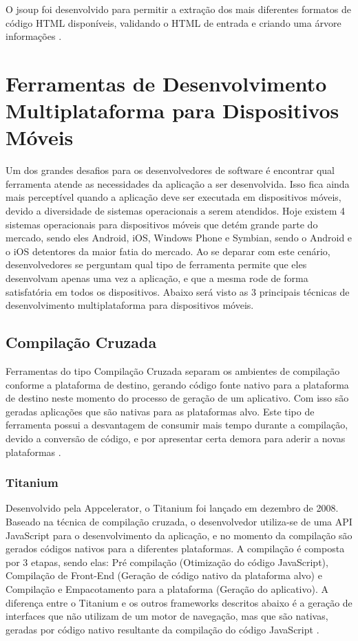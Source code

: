 O jsoup foi desenvolvido para permitir a extração dos mais diferentes formatos de código HTML disponíveis, validando o HTML de entrada e criando uma árvore informações \cite{JSOUP}.

\section{Ferramentas de Desenvolvimento Multiplataforma para Dispositivos Móveis}
Um dos grandes desafios para os desenvolvedores de software é encontrar qual ferramenta atende as necessidades da aplicação a ser desenvolvida. Isso fica ainda mais perceptível quando a aplicação deve ser executada em dispositivos móveis, devido a diversidade de sistemas operacionais a serem atendidos. Hoje existem 4 sistemas operacionais para dispositivos móveis que detém grande parte do mercado, sendo eles Android, iOS, Windows Phone e Symbian, sendo o Android e o iOS detentores da maior fatia do mercado. Ao se deparar com este cenário, desenvolvedores se perguntam qual tipo de ferramenta permite que eles desenvolvam apenas uma vez a aplicação, e que a mesma rode de forma satisfatória em todos os dispositivos. Abaixo será visto as 3 principais técnicas de desenvolvimento multiplataforma para dispositivos móveis\cite{CrossPlatformMobileDevelopment2011}.

\subsection{Compilação Cruzada}
Ferramentas do tipo Compilação Cruzada separam os ambientes de compilação conforme a plataforma de destino, gerando código fonte nativo para a plataforma de destino neste momento do processo de geração de um aplicativo. Com isso são geradas aplicações que são nativas para as plataformas alvo. Este tipo de ferramenta possui a desvantagem de consumir mais tempo durante a compilação, devido a conversão de código, e por apresentar certa demora para aderir a novas plataformas
\cite{CrossPlatformMobileDevelopment2011}.

\subsubsection{Titanium}
Desenvolvido pela Appcelerator, o Titanium foi lançado em dezembro de 2008. Baseado na técnica de compilação cruzada, o desenvolvedor utiliza-se de uma API JavaScript para o desenvolvimento da aplicação, e no momento da compilação são gerados códigos nativos para a diferentes plataformas. A compilação é composta por 3 etapas, sendo elas: Pré compilação (Otimização do código JavaScript), Compilação de Front-End (Geração de código nativo da plataforma alvo) e Compilação e Empacotamento para a plataforma (Geração do aplicativo). A diferença entre o Titanium e os outros frameworks descritos abaixo é a geração de interfaces que não utilizam de um motor de navegação, mas que são nativas, geradas por código nativo resultante da compilação do código JavaScript
\cite{CrossPlatformMobileDevelopment2011}.


